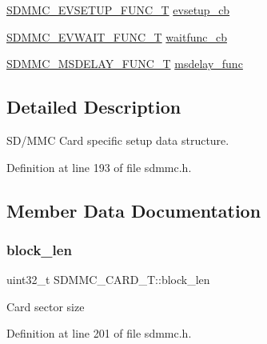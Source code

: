 \begin{DoxyCompactItemize}
\item 
\hyperlink{group___c_h_i_p___s_d_m_m_c___definitions_gad8f6b6485a8de8a55a8cdee88788a64c}{S\+D\+M\+M\+C\+\_\+\+E\+V\+S\+E\+T\+U\+P\+\_\+\+F\+U\+N\+C\+\_\+T} \hyperlink{struct_s_d_m_m_c___c_a_r_d___t_a0124bd3f8f2cfc307a229f98a0852874}{evsetup\+\_\+cb}
\item 
\hyperlink{group___c_h_i_p___s_d_m_m_c___definitions_ga3379c3596d02e20e0531dc1287df505f}{S\+D\+M\+M\+C\+\_\+\+E\+V\+W\+A\+I\+T\+\_\+\+F\+U\+N\+C\+\_\+T} \hyperlink{struct_s_d_m_m_c___c_a_r_d___t_a2ab1facd01f231799381db807f204de2}{waitfunc\+\_\+cb}
\item 
\hyperlink{group___c_h_i_p___s_d_m_m_c___definitions_ga910711513843f370e9b251ec60b245e7}{S\+D\+M\+M\+C\+\_\+\+M\+S\+D\+E\+L\+A\+Y\+\_\+\+F\+U\+N\+C\+\_\+T} \hyperlink{struct_s_d_m_m_c___c_a_r_d___t_a10bb6418c66c7794c18a890b031f1fa2}{msdelay\+\_\+func}
\end{DoxyCompactItemize}


\subsection{Detailed Description}
S\+D/\+M\+MC Card specific setup data structure. 

Definition at line 193 of file sdmmc.\+h.



\subsection{Member Data Documentation}
\mbox{\label{struct_s_d_m_m_c___c_a_r_d___t_a5e6e7086556a130e250c3732878528bc}} 
\subsubsection{\texorpdfstring{block\+\_\+len}{block\_len}}
{\footnotesize\ttfamily uint32\+\_\+t S\+D\+M\+M\+C\+\_\+\+C\+A\+R\+D\+\_\+\+T\+::block\+\_\+len}

Card sector size 

Definition at line 201 of file sdmmc.\+h.

\mbox{\label{struct_s_d_m_m_c___c_a_r_d___t_af634111acb673198465718eec3ec1b67}} 
